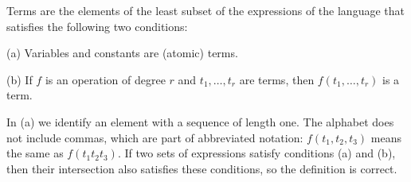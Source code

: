 Terms are the elements of the least subset of the expressions of the language that satisfies the following two conditions:

(a) Variables and constants are (atomic) terms.

(b) If $f$ is an operation of degree $r$ and $t_1, \ldots, t_r$ are terms, then $f(t_1, \ldots, t_r)$ is a term.

In (a) we identify an element with a sequence of length one. The alphabet does not include commas, which are part of abbreviated notation: $f(t_1, t_2, t_3)$ means the same as $f(t_1t_2t_3)$. If two sets of expressions satisfy conditions (a) and (b), then their intersection also satisfies these conditions, so the definition is correct.
